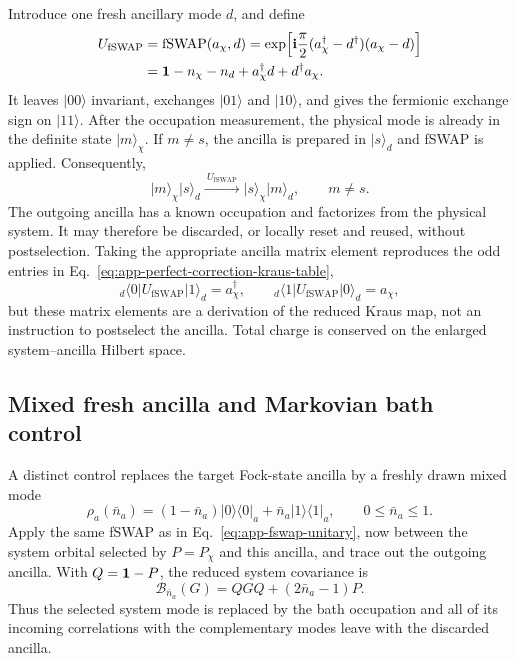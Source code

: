 Introduce one fresh ancillary mode \(d\), and define
\begin{align}
    U_{\mathrm{fSWAP}}
    &=\mathrm{fSWAP}(a_\chi,d)
      =\exp\!\left[
      \boldsymbol{\mathrm{i}}\frac{\pi}{2}(a_\chi^\dagger-d^\dagger)(a_\chi-d)\right]
      \nonumber\\
    &=\mathbf{1}-n_\chi-n_d+a_\chi^\dagger d+d^\dagger a_\chi.
    \label{eq:app-fswap-unitary}
\end{align}
It leaves \(\lvert00\rangle\) invariant, exchanges
\(\lvert01\rangle\) and \(\lvert10\rangle\), and gives the fermionic
exchange sign on \(\lvert11\rangle\).  After the occupation measurement,
the physical mode is already in the definite state \(\lvert m\rangle_\chi\).
If \(m\ne s\), the ancilla is prepared in \(\lvert s\rangle_d\) and
fSWAP is applied.  Consequently,
\begin{equation}
    \lvert m\rangle_\chi\lvert s\rangle_d
    \xrightarrow{\ U_{\mathrm{fSWAP}}\ }
    \lvert s\rangle_\chi\lvert m\rangle_d,
    \qquad m\ne s.
    \label{eq:app-fswap-deterministic-action}
\end{equation}
The outgoing ancilla has a known occupation and factorizes from the physical
system.  It may therefore be discarded, or locally reset and reused, without
postselection.  Taking the appropriate ancilla matrix element reproduces the
odd entries in Eq.~\eqref{eq:app-perfect-correction-kraus-table},
\begin{equation}
    {}_d\!\langle0|U_{\mathrm{fSWAP}}|1\rangle_d=a_\chi^\dagger,
    \qquad
    {}_d\!\langle1|U_{\mathrm{fSWAP}}|0\rangle_d=a_\chi,
    \label{eq:app-fswap-matrix-elements}
\end{equation}
but these matrix elements are a derivation of the reduced Kraus map, not an
instruction to postselect the ancilla.  Total charge is conserved on the
enlarged system--ancilla Hilbert space.

\subsection{Mixed fresh ancilla and Markovian bath control}
\label{app:mixed-fresh-ancilla}

A distinct control replaces the target Fock-state ancilla by a freshly drawn
mixed mode
\begin{equation}
    \rho_a(\bar n_a)
    =(1-\bar n_a)\lvert0\rangle\!\langle0\rvert_a
      +\bar n_a\lvert1\rangle\!\langle1\rvert_a,
    \qquad 0\leq \bar n_a\leq1 .
    \label{eq:app-mixed-ancilla-state}
\end{equation}
Apply the same fSWAP as in Eq.~\eqref{eq:app-fswap-unitary}, now between the
system orbital selected by \(P=P_\chi\) and this ancilla, and trace out the
outgoing ancilla.  With \(Q=\mathbf{1}-P\), the reduced system covariance is
\begin{equation}
    \boxed{
    \mathcal B_{\bar n_a}(G)
    =QGQ+(2\bar n_a-1)P .}
    \label{eq:app-mixed-ancilla-channel}
\end{equation}
Thus the selected system mode is replaced by the bath occupation and all of
its incoming correlations with the complementary modes leave with the
discarded ancilla.

